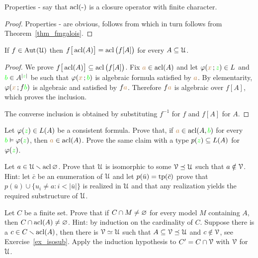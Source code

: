 Properties - say that $\mathop{\rm acl}(\mbox{-})$ is a closure operator with finite character.

\begin{proof}
Properties - are obvious,  follows from  which in turn follows from Theorem~\ref{thm_fmgalois}.
\end{proof}

\begin{proposition}\label{prop_estensionemappechiusuraalgebrica}
If $f\in\textrm{Aut\kern.15ex}(\EuScript U)$ then $f\big[\mathop{\rm acl}(A)\big]=\mathop{\rm acl}\big(f[A]\big)$ for every $A\subseteq\EuScript U$. 
\end{proposition}

\begin{proof}
We prove $f\big[\mathop{\rm acl}(A)\big]\subseteq\mathop{\rm acl}\big(f[A]\big)$. Fix ${\color{brown} a}\in\mathop{\rm acl}(A)$ and let $\varphi({\color{brown} x}\,;{\color{green} z})\in L$ and ${\color{green} b}\in A^{|{\color{green} z}|}$ be such that $\varphi({\color{brown} x}\,;{\color{green} b})$ is algebraic formula satisfied by ${\color{brown} a}$. By elementarity, $\varphi({\color{brown} x}\,;f{\color{green} b})$ is algebraic and satisfied by $f{\color{brown} a}$. Therefore  $f{\color{brown} a}$ is algebraic over $f[A]$, which proves the inclusion.

The converse inclusion is obtained by substituting  $f^{-1}$ for $f$ and $f[A]$ for $A$.
\end{proof}

\begin{exercise}\label{pofu}
Let $\varphi({\color{green} z})\in L(A)$ be a consistent formula. Prove that, if ${\color{brown} a}\in\mathop{\rm acl}(A,{\color{green} b})$ for every ${\color{green} b}\vDash\varphi({\color{green} z})$, then ${\color{brown} a}\in\mathop{\rm acl}(A)$. Prove the same claim with a type $p({\color{green} z})\subseteq L(A)$ for $\varphi({\color{green} z})$.\QED
\end{exercise}


\begin{exercise}\label{ex_isosub}
Let $a\in\EuScript U\smallsetminus\mathop{\rm acl}\varnothing$. Prove that $\EuScript U$ is isomorphic to some $\EuScript V\preceq \EuScript U$ such that $a\notin\EuScript V$. Hint: let $\bar c$ be an enumeration of $\EuScript U$ and let $p(\bar u)={\rm tp}(\bar c)$ prove that $p(\bar u)\cup\big\{ u_i\neq a :i<|\bar u|\big\}$ is realized in $\EuScript U$ and that any realization yields the required substructure of $\EuScript U$.\QED
\end{exercise}

\begin{exercise}\label{pofu2}
Let $C$ be a finite set. Prove that if $C\cap M\neq\varnothing$ for every model $M$ containing $A$, then $C\cap\mathop{\rm acl}(A)\neq\varnothing$. Hint: by induction on the cardinality of $C$. Suppose there is a $c\in C\smallsetminus\mathop{\rm acl}(A)$, then there is $\EuScript V\simeq\EuScript U$ such that $A\subseteq\EuScript V\preceq\EuScript U$ and $c\notin\EuScript V$, see Exercise~\ref{ex_isosub}. Apply the induction hypothesis to $C'=C\cap\EuScript V$ with $\EuScript V$ for $\EuScript U$.\QED
\end{exercise}


